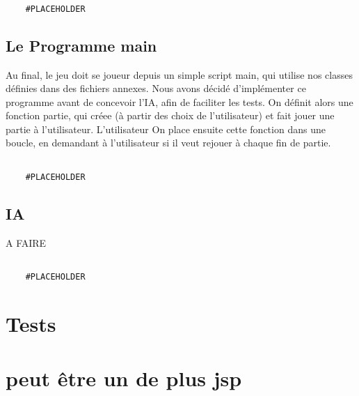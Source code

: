 \documentclass{article}
\begin{document}
\begin{verbatim}

    #PLACEHOLDER
\end{verbatim}


\subsection{Le Programme main}
Au final, le jeu doit se joueur depuis un simple script main, qui utilise nos classes
définies dans des fichiers annexes.
Nous avons décidé d'implémenter ce programme avant de concevoir l'IA, 
afin de faciliter les tests.
On définit alors une fonction partie, qui créee (à partir des choix de l'utilisateur) et fait jouer une partie à l'utilisateur.
L'utilisateur
On place ensuite cette fonction dans une boucle, en demandant à l'utilisateur si il veut rejouer
à chaque fin de partie.
\begin{verbatim}

    #PLACEHOLDER
\end{verbatim}
\subsection{IA}
A FAIRE
\begin{verbatim}

    #PLACEHOLDER
\end{verbatim}

\section{Tests}
\section{peut être un de plus jsp}
\end{document}
